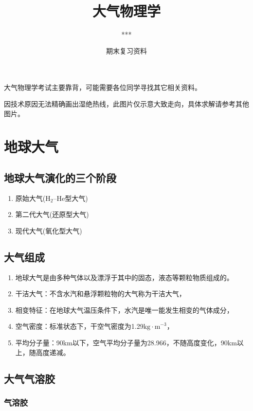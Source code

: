 \documentclass[UTF8,a4paper,11pt,oneside]{ctexbook}
\title{大气物理学}
\author{***}
\date{期末复习资料}
\begin{document}
\frontmatter 
\maketitle

大气物理学考试主要靠背，可能需要各位同学寻找其它相关资料。

因技术原因无法精确画出湿绝热线，此图片仅示意大致走向，具体求解请参考其他图片。%

\tableofcontents

\mainmatter

\chapter{地球大气}

\section{地球大气演化的三个阶段}
\begin{enumerate}
    \item 原始大气(\(\mathrm{H}_2\)--\(\mathrm{He}\)型大气)
    \item 第二代大气(还原型大气)
    \item 现代大气(氧化型大气)
\end{enumerate}

\section{大气组成}
\begin{enumerate}
    \item 地球大气是由多种气体以及漂浮于其中的固态，液态等颗粒物质组成的。
    \item 干洁大气：不含水汽和悬浮颗粒物的大气称为干洁大气，
    \item 相变特征：在地球大气温压条件下，水汽是唯一能发生相变的气体成分，
    \item 空气密度：标准状态下，干空气密度为1.29\(\mathrm{kg\cdot{}m}^{-3}\)，
    \item 平均分子量：90km以下，空气平均分子量为28.966，不随高度变化，90km以上，随高度递减。
\end{enumerate}

\section{大气气溶胶}

\subsection{气溶胶}
\end{document}
